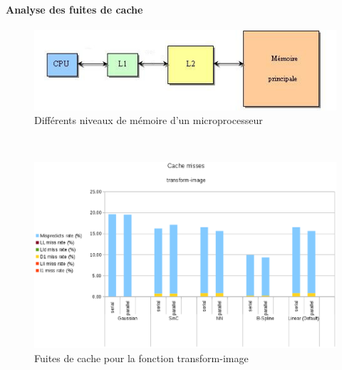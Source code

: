 \documentclass[10pt]{report}
\begin{document}
		\paragraph{Analyse des fuites de cache}
			\begin{figure}[h!]
				\begin{center}
					\includegraphics[width=15cm]{Reports/figures/Mem_hierarchy.jpg}
				\end{center}	
				\caption{Différents niveaux de mémoire d'un microprocesseur}
				\label{Différents niveaux de mémoire d'un microprocesseur}
			\end{figure}~\par
%		
			\begin{figure}[h!]
				\begin{center}
					\includegraphics[width=15cm]{Reports/figures/cache_misses_transform_image.eps}
				\end{center}	
				\caption{Fuites de cache pour la fonction transform-image}
				\label{Fuites de cache pour la fonction transform-image}
			\end{figure}~\par
\end{document}
